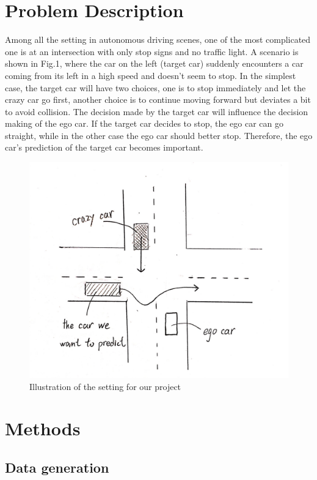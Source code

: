 \documentclass[conference]{IEEEtran}
\begin{document}
\section{Problem Description}
Among all the setting in autonomous driving scenes, one of the most complicated one is at an intersection with only stop signs and no traffic light. A scenario is shown in Fig.1, where the car on the left (target car) suddenly encounters a car coming from its left in a high speed and doesn't seem to stop. In the simplest case, the target car will have two choices, one is to stop immediately and let the crazy car go first, another choice is to continue moving forward but deviates a bit to avoid collision. The decision made by the target car will influence the decision making of the ego car. If the target car decides to stop, the ego car can go straight, while in the other case the ego car should better stop. Therefore, the ego car's prediction of the target car becomes important.
\begin{figure}[h!]
\centering
\includegraphics[scale = 0.08]{problem.png}
\caption{Illustration of the setting for our project}
\label{fig:reftraj}
\end{figure}

\section{Methods}

\subsection{Data generation}
\end{document}
